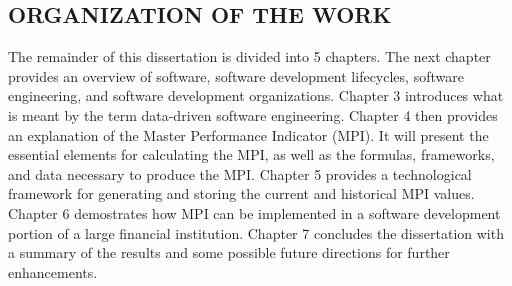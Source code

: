 \documentclass[SDSUThesis.tex]{subfiles}
\begin{document}
    


\subsection{ORGANIZATION OF THE WORK}

The remainder of this dissertation is divided into 5 chapters.  The next chapter provides
an overview of software, software development lifecycles, software engineering, and software
development organizations.  Chapter 3 introduces what is meant by the term data-driven
software engineering. Chapter 4 then provides an explanation of the Master Performance 
Indicator (MPI).  It will present the essential elements for calculating the MPI, as well
as the formulas, frameworks, and data necessary to produce the MPI. Chapter 5 provides
a technological framework for generating and storing the current and historical MPI values.
Chapter 6 demostrates how MPI can be implemented in a software development portion of 
a large financial institution.  Chapter 7 concludes the dissertation with a summary
of the results and some possible future directions for further enhancements. 
\end{document}
